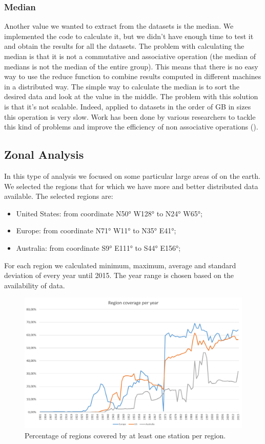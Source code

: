 \documentclass{vldb}
\begin{document}
\subsubsection{Median}
Another value we wanted to extract from the datasets is the median. We implemented the code to calculate it, but we didn't have enough time to test it and obtain the results for all the datasets. The problem with calculating the median is that it is not a commutative and associative operation (the median of medians is not the median of the entire group). This means that there is no easy way to use the reduce function to combine results computed in different machines in a distributed way. The simple way to calculate the median is to sort the desired data and look at the value in the middle. The problem with this solution is that it's not scalable. Indeed, applied to datasets in the order of GB in sizes this operation is very slow. Work has been done by various researchers to tackle this kind of problems and improve the efficiency of non associative operations (\cite{liu2009computing}).


\subsection{Zonal Analysis}
In this type of analysis we focused on some particular large areas of on the earth. We selected the regions that for which we have more and better distributed data available. The selected regions are:
\begin{itemize}
    \item United States: from coordinate N\ang{50;;} W\ang{128;;} to N\ang{24;;} W\ang{65;;};
    \item Europe: from coordinate N\ang{71;;} W\ang{11;;} to N\ang{35;;} E\ang{41;;};
    \item Australia: from coordinate S\ang{9;;} E\ang{111;;} to S\ang{44;;} E\ang{156;;};
\end{itemize}
For each region we calculated minimum, maximum, average and standard deviation of every year until 2015. The year range is chosen based on the availability of data.

\begin{figure}[tbh]
\includegraphics[width=1\linewidth]{stationsRegion}
\caption{Percentage of regions covered by at least one station per region.}
\label{fig:stationsRegion}
\end{figure}
\end{document}

